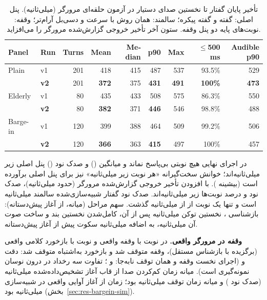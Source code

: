 \begin{table}[ht]
\centering
\caption{تأخیر پایان گفتار تا نخستین صدای دستیار در آزمون حلقه‌ای مرورگر (میلی‌ثانیه).
         پنل اصلی:  گفته  و  گفته پیکره؛ سالمند: همان روش با
         سرعت  و  دسی‌بل آرام‌تر؛ وقفه: نوبت‌های پایه دو پنل وقفه.
         ستون آخر تأخیر خروجی گزارش‌شده مرورگر را می‌افزاید.}
\label{tab:latency}
\small
\begin{latin}
\begin{tabular}{llrrrrrrr}
\toprule
Panel & Run & Turns & Mean & Median & p90 & Max & $\le$500 ms & Audible p90 \\
\midrule
Plain & v1 & 201 & 418 & 415 & 487 & 537 & 93.5\% & 529 \\
 & \textbf{v2} & 201 & \textbf{372} & 375 & \textbf{431} & \textbf{491} & \textbf{100\%} & \textbf{473} \\
Elderly & v1 & 80 & 435 & 433 & 508 & 575 & 86.3\% & 550 \\
 & \textbf{v2} & 80 & \textbf{382} & 371 & \textbf{446} & 546 & 98.8\% & 488 \\
Barge-in & v1 & 120 & 399 & 388 & 464 & 509 & 99.2\% & 506 \\
 & \textbf{v2} & 120 & \textbf{366} & 363 & \textbf{415} & 497 & 100\% & 457 \\
\bottomrule
\end{tabular}
\end{latin}
\end{table}

در اجرای نهایی هیچ نوبتی بی‌پاسخ نماند و میانگین () و صدک نود
() پنل اصلی زیر  میلی‌ثانیه‌اند؛ خوانش سخت‌گیرانه «هر نوبت زیر
 میلی‌ثانیه» نیز برای پنل اصلی برآورده است (بیشینه ). با افزودن
تأخیر خروجی گزارش‌شده مرورگر (حدود  میلی‌ثانیه)، صدک نود  و
 درصد نوبت‌ها زیر  میلی‌ثانیه‌اند. صدک نود گفتار شبیه‌سازی‌شده
سالمند  میلی‌ثانیه است و تنها یک نوبت از  از 
میلی‌ثانیه گذشت. سهم مراحل (میانه، از آغاز پیش‌دستانه): بازشناسی ،
نخستین توکن  میلی‌ثانیه پس از آن، کامل‌شدن نخستین بند  و ساخت صوت
آن  میلی‌ثانیه، به اضافه  میلی‌ثانیه سکوت پیش از آغاز پیش‌دستانه.

\textbf{وقفه در مرورگر واقعی.} در  نوبت با وقفه واقعی و  نوبت با
بازخورد کلامی واقعی (برگزیده با بازشناس مستقل)،  وقفه متوقف شد و
 بازخورد به‌اشتباه متوقف شد: دقت \textbf{} و 
\textbf{} (اجرای نخست  وقفه و همان  توقف نابه‌جا:  و
؛ تفاوت سه رخداد در  درون نوسان نمونه‌گیری است). میانه زمان
کم‌کردن صدا از قاب آغاز تشخیص‌داده‌شده  میلی‌ثانیه (صدک نود ) و میانه
زمان توقف  میلی‌ثانیه بود؛ زمان از آغاز آوایی واقعی در شبیه‌سازی 
میلی‌ثانیه بود (بخش~\ref{sec:res-bargein-sim}).

